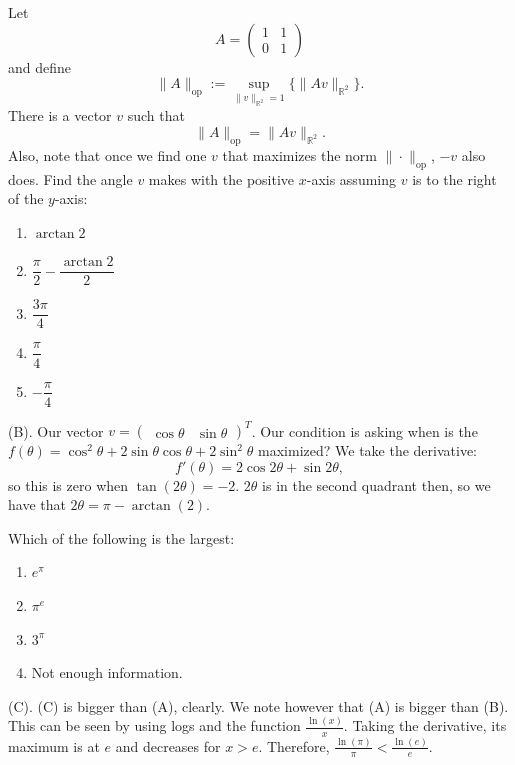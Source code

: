 \begin{exercise}
Let
\[
A=
\begin{pmatrix}
1 & 1\\
0 & 1
\end{pmatrix}
\]
and define
\[
\|A\|_{\mathrm{op}}
:=
\sup_{\|v\|_{\mathbb{R}^2}=1}\{\|Av\|_{\mathbb{R}^2}\}.
\]
There is a vector $v$ such that
\[
\|A\|_{\mathrm{op}}=\|Av\|_{\mathbb{R}^2}.
\]
Also, note that once we find one $v$ that maximizes the norm $\|\cdot\|_{\mathrm{op}}$, $-v$ also does. Find the angle $v$ makes with the positive $x$-axis assuming $v$ is to the right of the $y$-axis:

\begin{enumerate}[label=(\Alph*)]
    \item $\arctan 2$
    \item $\dfrac{\pi}{2} - \dfrac{\arctan 2}{2}$
    \item $\dfrac{3\pi}{4}$
    \item $\dfrac{\pi}{4}$
    \item $-\dfrac{\pi}{4}$
\end{enumerate}
\end{exercise}
\begin{solution}
(B). Our vector $v = \begin{pmatrix} \cos \theta & \sin \theta \end{pmatrix}^T$.
Our condition is asking when is the $f(\theta) = \cos^2\theta + 2\sin \theta \cos \theta + 
2\sin^2\theta$ maximized? We take the derivative:
\[
f'(\theta) = 2\cos 2\theta + \sin 2\theta,
\]
so this is zero when $\tan (2\theta) = -2$. $2\theta$ is in the second quadrant then, 
so we have that $2\theta = \pi - \arctan(2)$.
\end{solution}

\begin{exercise}
Which of the following is the largest:
\begin{enumerate}[label=(\Alph*)]
    \item $e^\pi$
    \item $\pi^e$
    \item $3^\pi$
    \item Not enough information.
\end{enumerate}
\end{exercise}
\begin{solution}
(C). (C) is bigger than (A), clearly. We note however that (A) is bigger than (B).
This can be seen by using logs and the function $\frac{\ln(x)}{x}$. Taking the derivative, 
its maximum is at $e$ and decreases for $x > e$. Therefore, $\frac{\ln(\pi)}{\pi} < \frac{\ln(e)}{e}$.
\end{solution}

